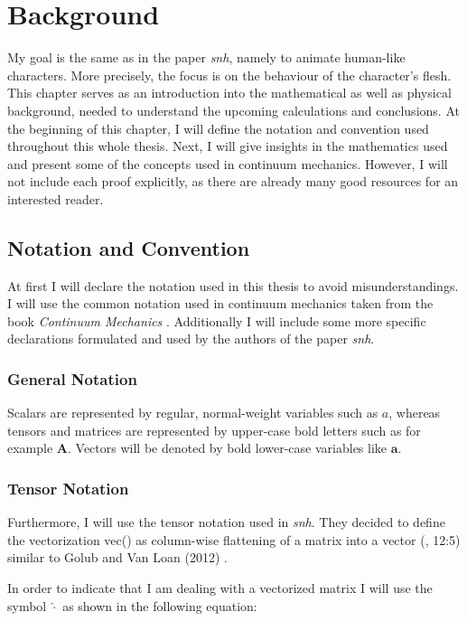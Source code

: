 \chapter{Background} \label{c:Background}
My goal is the same as in the paper \textit{\acrshort{snh}}, namely to animate human-like characters. More precisely, the focus is on the behaviour of the character's flesh. This chapter serves as an introduction into the mathematical as well as physical background, needed to understand the upcoming calculations and conclusions. At the beginning of this chapter, I will define the notation and convention used throughout this whole thesis. Next, I will give insights in the mathematics used and present some of the concepts used in continuum mechanics. However, I will not include each proof explicitly, as there are already many good resources for an interested reader.

\section{Notation and Convention}
At first I will declare the notation used in this thesis to avoid misunderstandings. I will use the common notation used in continuum mechanics taken from the book \textit{Continuum Mechanics} \cite{Spencer1980}. Additionally I will include some more specific declarations formulated and used by the authors of the paper \textit{\acrshort{snh}}.


\subsection{General Notation}
Scalars are represented by regular, normal-weight variables such as $a$, whereas tensors and matrices are represented by upper-case bold letters such as for example $\textbf{A}$. Vectors will be denoted by bold lower-case variables like $\textbf{a}$. 


\subsection{Tensor Notation}
Furthermore, I will use the tensor notation used in \textit{\acrshort{snh}}. They decided to define the vectorization vec(\cdot) as column-wise flattening of a matrix into a vector (\cite{Smith:2018:SNF:3191713.3180491}, 12:5) similar to Golub and Van Loan (2012) \cite{golub2012matrix}.

In order to indicate that I am dealing with a vectorized matrix I will use the symbol $\check{\cdot}$ as shown in the following equation:

